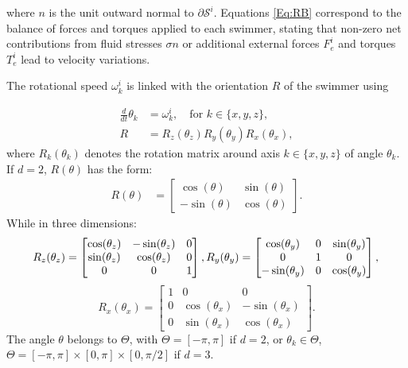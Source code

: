 \documentclass[graybox]{svmult}
\newcommand{\angvel}{\omega} %
\newcommand{\Rmat}{R} %
\newcommand{\Angle}{\theta}
\newcommand{\Solid}{\mathcal{S}} %
\newcommand{\normal}{n} %
\begin{document}
where $\normal$ is the unit outward normal to $\partial \Solid^i$. Equations \eqref{Eq:RB} correspond to the balance of forces and torques applied to each swimmer, stating that non-zero net contributions from fluid stresses $\sigma n$ or additional external forces $F_e^i$ and torques $T_e^i$ lead to velocity variations.



The rotational speed $\angvel^i_k$ is linked with the orientation $R$ of the swimmer using

\begin{equation*}
	\begin{aligned}
		\frac{d}{dt} \Angle_k &= \angvel^i_k, \quad \text{for $k \in \{x,y,z\}$},\\
		\Rmat &=\Rmat_z(\Angle_z)\Rmat_y(\Angle_y)\Rmat_x(\Angle_x),
	\end{aligned}
\end{equation*}
where $R_k(\Angle_k)$ denotes the rotation matrix around axis $k \in \{x,y,z\}$ of 
angle $\Angle_k$. If $d=2$, $R(\theta)$ has the form: 
\begin{equation*}
	\begin{aligned}
		\Rmat(\Angle) &= \begin{bmatrix}
			\cos(\Angle) & \sin(\Angle)\\
			-\sin(\Angle) & \cos(\Angle)
		\end{bmatrix}.
	\end{aligned}
\end{equation*}
While in three dimensions:
$$	
	\Rmat_z(\Angle_z) = \begin{bmatrix}
		\cos(\Angle_z) & -\sin(\Angle_z) & 0\\
		\sin(\Angle_z) & \cos(\Angle_z)& 0 \\
		0& 0 & 1
	\end{bmatrix},
	\Rmat_y(\Angle_y) = \begin{bmatrix}
		\cos(\Angle_y) &0 & \sin(\Angle_y) \\
		0& 1& 0\\
		-\sin(\Angle_y) & 0& \cos(\Angle_y)
	\end{bmatrix},\\
$$
$$
	\Rmat_x(\Angle_x) = \begin{bmatrix}
		1 & 0 & 0\\
		0 &\cos(\Angle_x) & -\sin(\Angle_x) \\
		0 &\sin(\Angle_x) & \cos(\Angle_x) 
	\end{bmatrix}.
$$
The angle $\Angle$ belongs to  $\Theta$, with $\Theta = [-\pi,\pi]$ if $d=2$, 
or $\Angle_k \in \Theta$, $\Theta=[-\pi,\pi]\times[0,\pi]\times[0,\pi/2]$ if $d=3$.
\end{document}
